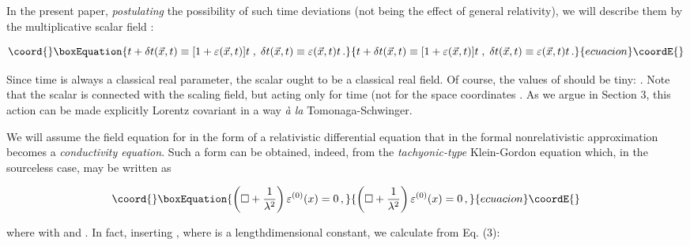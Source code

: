 \documentclass[a4paper,12pt]{article}
\begin{document}
In the present paper, {\it postulating} the possibility of such time deviations (not being the effect of general relativity), we will describe them by the multiplicative scalar field \coordHE{}:

\vspace{-0.2cm}
 
\begin{equation}\coord{}\boxEquation{
t + \delta t(\vec{x},t) \equiv [1 + \varepsilon (\vec{x},t)]t \;,\; \delta t(\vec{x},t) \equiv \varepsilon (\vec{x},t) t\,.
}{
t + \delta t(\vec{x},t) \equiv [1 + \varepsilon (\vec{x},t)]t \;,\; \delta t(\vec{x},t) \equiv \varepsilon (\vec{x},t) t\,.
}{ecuacion}\coordE{}\end{equation}

\ni Since time \coordHE{} is always a classical real parameter, the scalar \coordHE{} ought to be a classical real field. Of course, the values of \coordHE{} should be tiny: \coordHE{}. Note that the scalar \coordHE{} is connected with the scaling field, but acting only for time \coordHE{} (not for the space coordinates \coordHE{}. As we argue in Section 3, this action can be made explicitly Lorentz covariant in a way {\it \`{a} la} Tomonaga-Schwinger.

\vspace{0.2cm}


\vspace{0.2cm}

We will assume the field equation for \coordHE{} in the form of a relativistic differential equation that in the formal nonrelativistic approximation becomes a {\it conductivity equation}. Such a form can be obtained, indeed, from the {\it tachyonic-type} Klein-Gordon equation which, in the sourceless case, may be written as

\begin{equation}\coord{}\boxEquation{
\left( \Box + \frac{1}{\lambda^2}\right) \varepsilon^{(0)} (x) = 0 \,,
}{
\left( \Box + \frac{1}{\lambda^2}\right) \varepsilon^{(0)} (x) = 0 \,,
}{ecuacion}\coordE{}\end{equation}

\ni where \coordHE{} with \coordHE{} and \coordHE{}. In fact, inserting \coordHE{}, where \coordHE{} is a lengthdimensional constant, we calculate from Eq. (3):
\end{document}
